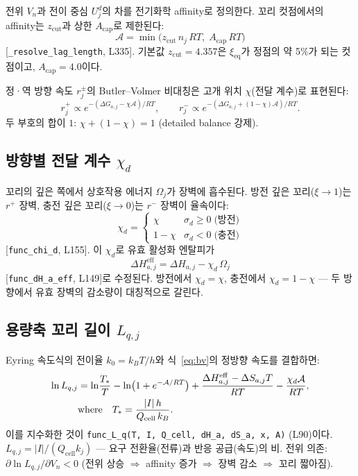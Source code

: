 \documentclass[11pt,a4paper]{article}
\newcommand{\eff}{\mathrm{eff}}
\newcommand{\eq}{\mathrm{eq}}
\newcommand{\cell}{\mathrm{cell}}
\begin{document}
전위 $V_n$과 전이 중심 $U_j^d$의 차를 전기화학 affinity로 정의한다.
꼬리 컷점에서의 affinity는 $z_{\mathrm{cut}}$과 상한 $A_{\mathrm{cap}}$로 제한된다:
\begin{equation}
  \mathcal{A} = \min\!\big(z_{\mathrm{cut}}\,n_j\,RT,\; A_{\mathrm{cap}}\,RT\big)
  \label{eq:affinity}
\end{equation}
[\texttt{\_resolve\_lag\_length}, L335]. 기본값 $z_{\mathrm{cut}}=4.357$은
$\xi_{\eq}$가 정점의 약 5\%가 되는 컷점이고, $A_{\mathrm{cap}}=4.0$이다.

정·역 방향 속도 $r_j^\pm$의 Butler--Volmer 비대칭은
고개 위치 $\chi$(전달 계수)로 표현된다:
\begin{equation}
  r_j^+ \propto e^{-(\Delta G_{a,j}-\chi\mathcal{A})/RT},\qquad
  r_j^- \propto e^{-(\Delta G_{a,j}+(1-\chi)\mathcal{A})/RT}.
  \label{eq:bv}
\end{equation}
두 부호의 합이 $1$: $\chi + (1-\chi) = 1$ (detailed balance 강제).

\subsection{방향별 전달 계수 $\chi_d$}

꼬리의 깊은 쪽에서 상호작용 에너지 $\Omega_j$가 장벽에 흡수된다.
방전 깊은 꼬리($\xi\to1$)는 $r^+$ 장벽, 충전 깊은 꼬리($\xi\to0$)는 $r^-$ 장벽이 율속이다:
\begin{equation}
  \chi_d = \begin{cases} \chi & \sigma_d \ge 0 \;\text{(방전)}\\ 1-\chi & \sigma_d < 0 \;\text{(충전)}\end{cases}
  \label{eq:chid}
\end{equation}
[\texttt{func\_chi\_d}, L155]. 이 $\chi_d$로 유효 활성화 엔탈피가
\begin{equation}
  \Delta H_{a,j}^{\eff} = \Delta H_{a,j} - \chi_d\,\Omega_j
  \label{eq:dHeff}
\end{equation}
[\texttt{func\_dH\_a\_eff}, L149]로 수정된다. 방전에서 $\chi_d=\chi$,
충전에서 $\chi_d=1-\chi$ — 두 방향에서 유효 장벽의 감소량이 대칭적으로 갈린다.

\subsection{용량축 꼬리 길이 $L_{q,j}$}

Eyring 속도식의 전이율 $k_0 = k_BT/h$와 식~\eqref{eq:bv}의 정방향 속도를 결합하면:
\begin{align}
  \ln L_{q,j} &= \ln\!\frac{T_*}{T} - \ln\!\big(1+e^{-\mathcal{A}/RT}\big)
    + \frac{\Delta H_{a,j}^{\eff}-\Delta S_{a,j}T}{RT} - \frac{\chi_d\mathcal{A}}{RT},
  \label{eq:lnLq}\\
  &\text{where}\quad T_* = \frac{|I|\,h}{Q_\cell\,k_B}.
  \notag
\end{align}
이를 지수화한 것이 \texttt{func\_L\_q(T, I, Q\_cell, dH\_a, dS\_a, x, A)} (L90)이다.
$L_{q,j} = |I|/(Q_\cell k_j)$ — 요구 전환율(전류)과 반응 공급(속도)의 비.
전위 의존: $\partial\ln L_{q,j}/\partial V_n < 0$
(전위 상승 $\Rightarrow$ affinity 증가 $\Rightarrow$ 장벽 감소 $\Rightarrow$ 꼬리 짧아짐).
\end{document}
